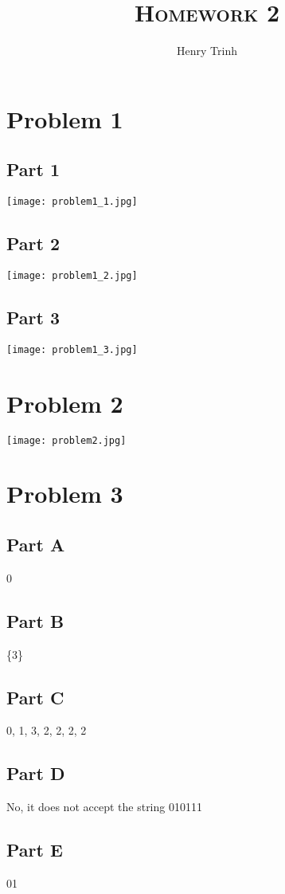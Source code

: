 \documentclass[12pt]{article}
\title{\textsc{Homework 2}}
\author{Henry Trinh}
\begin{document}
\maketitle

\newpage %
\section*{Problem 1}
\subsection*{Part 1}
\texttt{[image: problem1\_1.jpg]}
\subsection*{Part 2}
\texttt{[image: problem1\_2.jpg]}
\subsection*{Part 3}
\texttt{[image: problem1\_3.jpg]}

\newpage
\section*{Problem 2}
\texttt{[image: problem2.jpg]}

\newpage
\section*{Problem 3}
\subsection*{Part A}
0
\subsection*{Part B}
\{3\}
\subsection*{Part C}
0, 1, 3, 2, 2, 2, 2
\subsection*{Part D}
No, it does not accept the string 010111
\subsection*{Part E}
01
\end{document}
